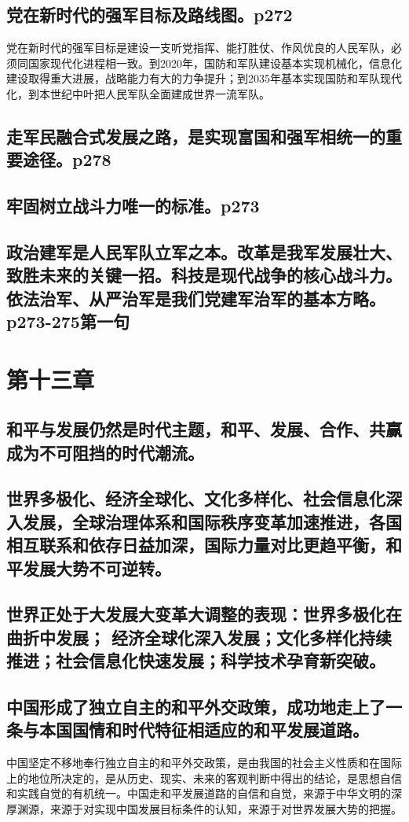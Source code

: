 \documentclass[UTF8]{ctexart}
\begin{document}
\subsection{党在新时代的强军目标及路线图。p272}
\par 党在新时代的强军目标是建设一支听党指挥、能打胜仗、作风优良的人民军队，必须同国家现代化进程相一致。到2020年，国防和军队建设基本实现机械化，信息化建设取得重大进展，战略能力有大的力争提升；到2035年基本实现国防和军队现代化，到本世纪中叶把人民军队全面建成世界一流军队。
\subsection{走军民融合式发展之路，是实现富国和强军相统一的重要途径。p278}
\subsection{牢固树立战斗力唯一的标准。p273}
\subsection{政治建军是人民军队立军之本。改革是我军发展壮大、致胜未来的关键一招。科技是现代战争的核心战斗力。依法治军、从严治军是我们党建军治军的基本方略。p273-275第一句}
\section{第十三章}
\subsection{和平与发展仍然是时代主题，和平、发展、合作、共赢成为不可阻挡的时代潮流。}
\subsection{世界多极化、经济全球化、文化多样化、社会信息化深入发展，全球治理体系和国际秩序变革加速推进，各国相互联系和依存日益加深，国际力量对比更趋平衡，和平发展大势不可逆转。}
\subsection{世界正处于大发展大变革大调整的表现：世界多极化在曲折中发展； 经济全球化深入发展；文化多样化持续推进；社会信息化快速发展；科学技术孕育新突破。}
\subsection{中国形成了独立自主的和平外交政策，成功地走上了一条与本国国情和时代特征相适应的和平发展道路。}
中国坚定不移地奉行独立自主的和平外交政策，是由我国的社会主义性质和在国际上的地位所决定的，是从历史、现实、未来的客观判断中得出的结论，是思想自信和实践自觉的有机统一。中国走和平发展道路的自信和自觉，来源于中华文明的深厚渊源，来源于对实现中国发展目标条件的认知，来源于对世界发展大势的把握。
\end{document}
